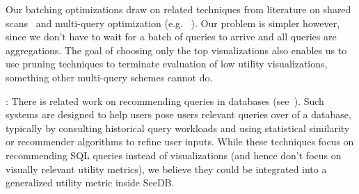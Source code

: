 

 Our batching optimizations
draw on
related techniques from literature on shared
scans~\cite{Fernandez:1994:RBW:191843.191947} and multi-query
optimization (e.g.
~\cite{DBLP:journals/tods/Sellis88}).
Our problem is simpler however, since we don't have 
to wait for a batch of queries to arrive and all queries
are aggregations. 
The goal of choosing only the top visualizations also enables us
to use pruning techniques to terminate evaluation of low utility visualizations, 
something other multi-query schemes cannot do.

: There is related work on recommending queries in databases 
(see~\cite{marcel2011survey}).  Such systems are
 designed to help users pose users relevant
queries over of a database, typically by consulting historical query
workloads and using statistical similarity or recommender algorithms
to refine user inputs.  
While these techniques focus on recommending SQL queries instead of visualizations
(and hence don't focus on visually relevant utility metrics),  we
believe they could be integrated into a generalized utility metric
inside SeeDB.







